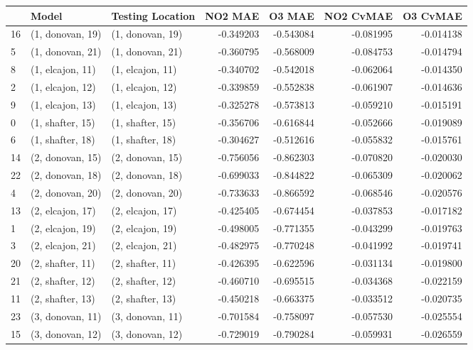 \begin{tabular}{lllrrrr}
\toprule
{} &             Model &  Testing Location &   NO2 MAE &    O3 MAE &  NO2 CvMAE &  O3 CvMAE \\
\midrule
16 &  (1, donovan, 19) &  (1, donovan, 19) & -0.349203 & -0.543084 &  -0.081995 & -0.014138 \\
5  &  (1, donovan, 21) &  (1, donovan, 21) & -0.360795 & -0.568009 &  -0.084753 & -0.014794 \\
8  &  (1, elcajon, 11) &  (1, elcajon, 11) & -0.340702 & -0.542018 &  -0.062064 & -0.014350 \\
2  &  (1, elcajon, 12) &  (1, elcajon, 12) & -0.339859 & -0.552838 &  -0.061907 & -0.014636 \\
9  &  (1, elcajon, 13) &  (1, elcajon, 13) & -0.325278 & -0.573813 &  -0.059210 & -0.015191 \\
0  &  (1, shafter, 15) &  (1, shafter, 15) & -0.356706 & -0.616844 &  -0.052666 & -0.019089 \\
6  &  (1, shafter, 18) &  (1, shafter, 18) & -0.304627 & -0.512616 &  -0.055832 & -0.015761 \\
14 &  (2, donovan, 15) &  (2, donovan, 15) & -0.756056 & -0.862303 &  -0.070820 & -0.020030 \\
22 &  (2, donovan, 18) &  (2, donovan, 18) & -0.699033 & -0.844822 &  -0.065309 & -0.020062 \\
4  &  (2, donovan, 20) &  (2, donovan, 20) & -0.733633 & -0.866592 &  -0.068546 & -0.020576 \\
13 &  (2, elcajon, 17) &  (2, elcajon, 17) & -0.425405 & -0.674454 &  -0.037853 & -0.017182 \\
1  &  (2, elcajon, 19) &  (2, elcajon, 19) & -0.498005 & -0.771355 &  -0.043299 & -0.019763 \\
3  &  (2, elcajon, 21) &  (2, elcajon, 21) & -0.482975 & -0.770248 &  -0.041992 & -0.019741 \\
20 &  (2, shafter, 11) &  (2, shafter, 11) & -0.426395 & -0.622596 &  -0.031134 & -0.019800 \\
21 &  (2, shafter, 12) &  (2, shafter, 12) & -0.460710 & -0.695515 &  -0.034368 & -0.022159 \\
11 &  (2, shafter, 13) &  (2, shafter, 13) & -0.450218 & -0.663375 &  -0.033512 & -0.020735 \\
23 &  (3, donovan, 11) &  (3, donovan, 11) & -0.701584 & -0.758097 &  -0.057530 & -0.025554 \\
15 &  (3, donovan, 12) &  (3, donovan, 12) & -0.729019 & -0.790284 &  -0.059931 & -0.026559 \\

\end{tabular}
